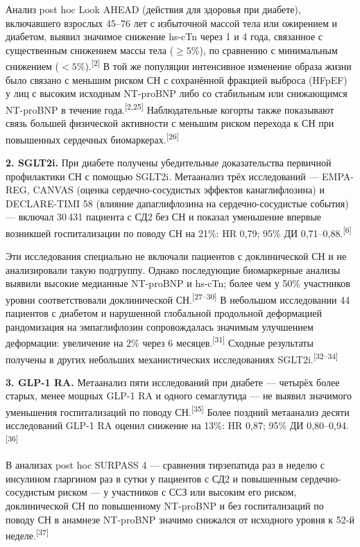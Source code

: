 \documentclass[11pt,a4paper]{article}
\newcommand{\src}[1]{\textsuperscript{[#1]}}
\begin{document}
Анализ post hoc Look AHEAD (действия для здоровья при диабете), включавшего взрослых 45--76 лет с избыточной массой тела или ожирением и диабетом, выявил значимое снижение hs-cTn через 1 и 4 года, связанное с существенным снижением массы тела ($\geq5\%$), по сравнению с минимальным снижением ($<5\%$).\src{2} В той же популяции интенсивное изменение образа жизни было связано с меньшим риском СН с сохранённой фракцией выброса (HFpEF) у лиц с высоким исходным NT-proBNP либо со стабильным или снижающимся NT-proBNP в течение года.\src{2,25} Наблюдательные когорты также показывают связь большей физической активности с меньшим риском перехода к СН при повышенных сердечных биомаркерах.\src{26}

\textbf{2. SGLT2i.} При диабете получены убедительные доказательства первичной профилактики СН с помощью SGLT2i. Метаанализ трёх исследований --- EMPA-REG, CANVAS (оценка сердечно-сосудистых эффектов канаглифлозина) и DECLARE-TIMI 58 (влияние дапаглифлозина на сердечно-сосудистые события) --- включал 30\,431 пациента с СД2 без СН и показал уменьшение впервые возникшей госпитализации по поводу СН на 21\%: HR 0,79; 95\% ДИ 0,71--0,88.\src{6}

Эти исследования специально не включали пациентов с доклинической СН и не анализировали такую подгруппу. Однако последующие биомаркерные анализы выявили высокие медианные NT-proBNP и hs-cTn; более чем у 50\% участников уровни соответствовали доклинической СН.\src{27--30} В небольшом исследовании 44 пациентов с диабетом и нарушенной глобальной продольной деформацией рандомизация на эмпаглифлозин сопровождалась значимым улучшением деформации: увеличение на 2\% через 6 месяцев.\src{31} Сходные результаты получены в других небольших механистических исследованиях SGLT2i.\src{32--34}

\textbf{3. GLP-1 RA.} Метаанализ пяти исследований при диабете --- четырёх более старых, менее мощных GLP-1 RA и одного семаглутида --- не выявил значимого уменьшения госпитализаций по поводу СН.\src{35} Более поздний метаанализ десяти исследований GLP-1 RA оценил снижение на 13\%: HR 0,87; 95\% ДИ 0,80--0,94.\src{36}

В анализах post hoc SURPASS 4 --- сравнения тирзепатида раз в неделю с инсулином гларгином раз в сутки у пациентов с СД2 и повышенным сердечно-сосудистым риском --- у участников с ССЗ или высоким его риском, доклинической СН по повышенному NT-proBNP и без госпитализаций по поводу СН в анамнезе NT-proBNP значимо снижался от исходного уровня к 52-й неделе.\src{37}
\end{document}
